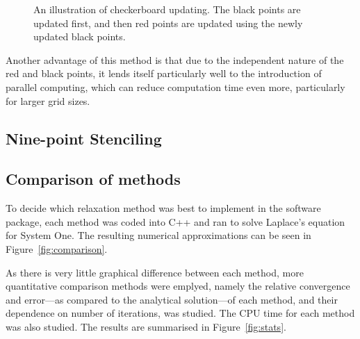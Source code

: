 \documentclass[12pt, a4paper]{article}
\begin{document}
\begin{figure}[h!]
\begin{center}
\end{center}
\caption{An illustration of checkerboard updating. The black points are updated first,
and then red points are updated using the newly updated black points.}
\label{fig:checker}
\end{figure}

Another advantage of this method is that due to the independent nature of the red and
black points, it lends itself particularly well to the introduction of parallel 
computing, which can reduce computation time even more, particularly for larger grid
sizes.

%

\subsection{Nine-point Stenciling}


\subsection{Comparison of methods}

To decide which relaxation method was best to implement in the software package,
each method was coded into C++ and ran to solve Laplace's equation for System One.
The resulting numerical approximations can be seen in Figure~\ref{fig:comparison}.


As there is very little graphical difference between each method, more quantitative
comparison methods were emplyed, namely the relative convergence and error---as
compared to the analytical solution---of each method, and their dependence on number
of iterations, was studied. The CPU time for each method was also studied. The results
are summarised in Figure~\ref{fig:stats}.
\end{document}
